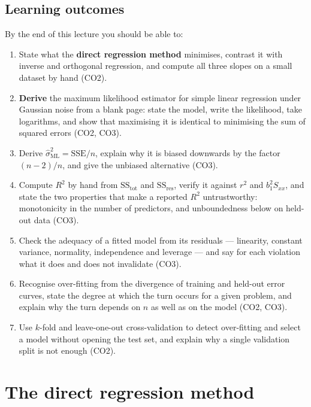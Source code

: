 \documentclass[11pt]{article}
\begin{document}
\subsection{Learning outcomes}

By the end of this lecture you should be able to:

\begin{enumerate}[leftmargin=*]
  \item State what the \textbf{direct regression method} minimises, contrast
    it with inverse and orthogonal regression, and compute all three slopes on
    a small dataset by hand (CO2).
  \item \textbf{Derive} the maximum likelihood estimator for simple linear
    regression under Gaussian noise from a blank page: state the model, write
    the likelihood, take logarithms, and show that maximising it is identical
    to minimising the sum of squared errors (CO2, CO3).
  \item Derive $\hat\sigma^2_{\mathrm{ML}} = \mathrm{SSE}/n$, explain why it is
    biased downwards by the factor $(n-2)/n$, and give the unbiased
    alternative (CO3).
  \item Compute $R^2$ by hand from $\mathrm{SS_{tot}}$ and
    $\mathrm{SS_{res}}$, verify it against $r^2$ and $b_1^2S_{xx}$, and state
    the two properties that make a reported $R^2$ untrustworthy: monotonicity
    in the number of predictors, and unboundedness below on held-out data
    (CO3).
  \item Check the adequacy of a fitted model from its residuals --- linearity,
    constant variance, normality, independence and leverage --- and say for
    each violation what it does and does not invalidate (CO3).
  \item Recognise over-fitting from the divergence of training and held-out
    error curves, state the degree at which the turn occurs for a given
    problem, and explain why the turn depends on $n$ as well as on the model
    (CO2, CO3).
  \item Use $k$-fold and leave-one-out cross-validation to detect over-fitting
    and select a model without opening the test set, and explain why a single
    validation split is not enough (CO2).
\end{enumerate}

\section{The direct regression method}
\label{sec:direct}
\end{document}
